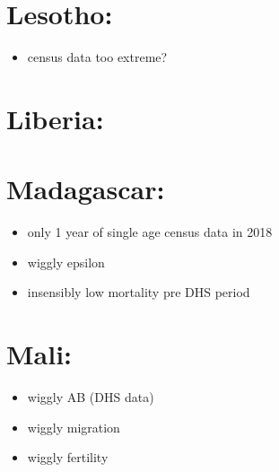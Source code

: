 \documentclass[12pt,a4paper]{article}
\begin{document}
\section*{Lesotho:}
\begin{itemize}
\item census data too extreme?
\end{itemize}

\section*{Liberia:}
\begin{itemize}
\end{itemize}

\section*{Madagascar:}
\begin{itemize}
\item only 1 year of single age census data in 2018
\item wiggly epsilon
\item insensibly low mortality pre DHS period
\end{itemize}

\section*{Mali:}
\begin{itemize}
\item wiggly AB (DHS data)
\item wiggly migration
\item wiggly fertility
\end{itemize}
\end{document}
